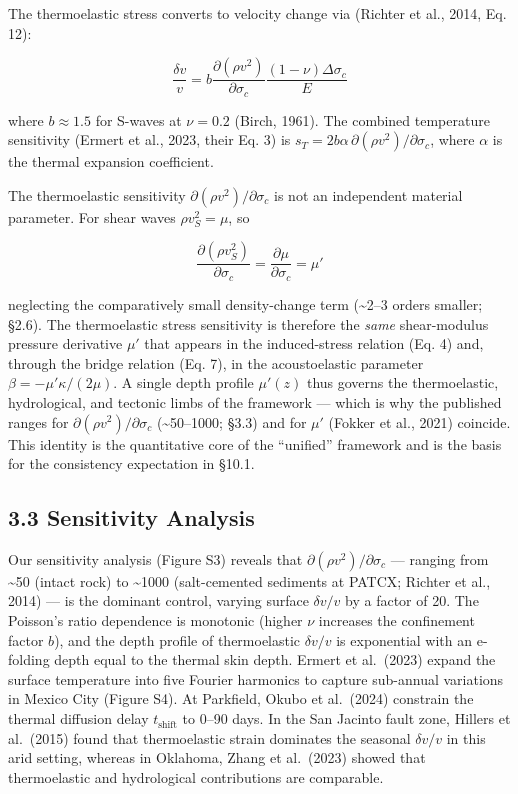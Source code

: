 \documentclass[12pt]{article}
\begin{document}
The thermoelastic stress converts to velocity change via (Richter et
al., 2014, Eq. 12):

\[\frac{\delta v}{v} = b \frac{\partial(\rho v^2)}{\partial \sigma_c} \frac{(1-\nu)\Delta\sigma_c}{E} \tag{9}\]

where \(b \approx 1.5\) for S-waves at \(\nu = 0.2\) (Birch, 1961). The
combined temperature sensitivity (Ermert et al., 2023, their Eq. 3) is
\(s_T = 2b\alpha \, \partial(\rho v^2)/\partial\sigma_c\), where
\(\alpha\) is the thermal expansion coefficient.

The thermoelastic sensitivity \(\partial(\rho v^2)/\partial\sigma_c\) is
not an independent material parameter. For shear waves
\(\rho v_S^2 = \mu\), so

\[\frac{\partial(\rho v_S^2)}{\partial\sigma_c} = \frac{\partial\mu}{\partial\sigma_c} = \mu' \tag{9b}\]

neglecting the comparatively small density-change term
(\textasciitilde{}2--3 orders smaller; §2.6). The thermoelastic stress
sensitivity is therefore the \emph{same} shear-modulus pressure
derivative \(\mu'\) that appears in the induced-stress relation (Eq. 4)
and, through the bridge relation (Eq. 7), in the acoustoelastic
parameter \(\beta = -\mu'\kappa/(2\mu)\). A single depth profile
\(\mu'(z)\) thus governs the thermoelastic, hydrological, and tectonic
limbs of the framework --- which is why the published ranges for
\(\partial(\rho v^2)/\partial\sigma_c\) (\textasciitilde{}50--1000;
§3.3) and for \(\mu'\) (Fokker et al., 2021) coincide. This identity is
the quantitative core of the ``unified'' framework and is the basis for
the consistency expectation in §10.1.

\subsection{3.3 Sensitivity Analysis}\label{sensitivity-analysis}

Our sensitivity analysis (Figure S3) reveals that
\(\partial(\rho v^2)/\partial\sigma_c\) --- ranging from
\textasciitilde{}50 (intact rock) to \textasciitilde{}1000
(salt-cemented sediments at PATCX; Richter et al., 2014) --- is the
dominant control, varying surface \(\delta v/v\) by a factor of 20. The
Poisson's ratio dependence is monotonic (higher \(\nu\) increases the
confinement factor \(b\)), and the depth profile of thermoelastic
\(\delta v/v\) is exponential with an e-folding depth equal to the
thermal skin depth. Ermert et al.~(2023) expand the surface temperature
into five Fourier harmonics to capture sub-annual variations in Mexico
City (Figure S4). At Parkfield, Okubo et al.~(2024) constrain the
thermal diffusion delay \(t_{\text{shift}}\) to 0--90 days. In the San
Jacinto fault zone, Hillers et al.~(2015) found that thermoelastic
strain dominates the seasonal \(\delta v/v\) in this arid setting,
whereas in Oklahoma, Zhang et al.~(2023) showed that thermoelastic and
hydrological contributions are comparable.
\end{document}
